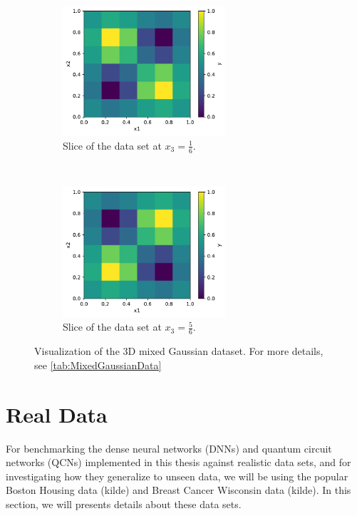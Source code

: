 \begin{figure}[H]
    \centering
    \begin{subfigure}[t]{0.5\textwidth}
        \centering
        \includegraphics[height=1.9in]{latex/figures/gaussian_3D_1.pdf}
        \caption{Slice of the data set at $x_3 = \frac{1}{6}$.}
        
    \end{subfigure}%
    ~ 
    \begin{subfigure}[t]{0.5\textwidth}
        \centering
        \includegraphics[height=1.9in]{latex/figures/gaussian_3D_2.pdf}
        \caption{Slice of the data set at $x_3 = \frac{5}{6}$.}
    \end{subfigure}
    \caption{Visualization of the 3D mixed Gaussian dataset. For more details, see \autoref{tab:MixedGaussianData}}
    \label{fig:mixed Gaussian 3D}
\end{figure}





\section{Real Data}\label{sec:Real Data}
For benchmarking the dense neural networks (DNNs) and quantum circuit networks (QCNs) implemented in this thesis against realistic data sets, and for investigating how they generalize to unseen data, we will be using the popular Boston Housing data (kilde) and Breast Cancer Wisconsin data (kilde). In this section, we will presents details about these data sets. 

